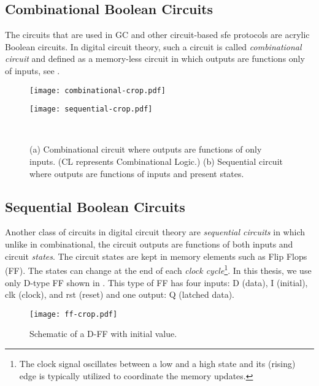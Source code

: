 \subsection{Combinational Boolean Circuits}\label{ssec:prelim-comb}
The circuits that are used in GC and other circuit-based \acrshort{sfe} protocols are acrylic Boolean circuits.
In digital circuit theory, such a circuit is called \emph{combinational circuit} and defined as a memory-less circuit in which outputs are functions only of inputs, see .

\begin{figure}[ht]
    \centering
    \begin{minipage}[t]{0.35\textwidth}
        \texttt{[image: combinational-crop.pdf]}
        \label{fig:combinational}
    \end{minipage}
    \begin{minipage}[t]{0.30\textwidth}
        \texttt{[image: sequential-crop.pdf]}
        \label{fig:sequential}
    \end{minipage}\\
    \caption{(a) Combinational circuit where outputs are functions of only inputs. (CL represents Combinational Logic.)
    (b) Sequential circuit where outputs are functions of inputs and present states.
    }\label{fig:combinational-sequential}
\end{figure}

\subsection{Sequential Boolean Circuits}\label{ssec:prelim-seq}
Another class of circuits in digital circuit theory are \emph{sequential circuits} in which unlike in combinational, the circuit outputs are functions of both inputs and circuit \emph{states}.
The circuit states are kept in memory elements such as Flip Flops (FF).
The states can change at the end of each \emph{clock cycle}\footnote{The clock signal oscillates between a low and a high state and its (rising) edge is typically utilized to coordinate the memory updates.}.
In this thesis, we use only D-type FF shown in .
This type of FF has four inputs: D (data), I (initial), clk (clock), and rst (reset) and one output: Q (latched data).

\begin{figure}[ht]
    \centering
	\texttt{[image: ff-crop.pdf]}
	\caption{Schematic of a D-FF with initial value.}
	\label{fig:ff}
\end{figure}

